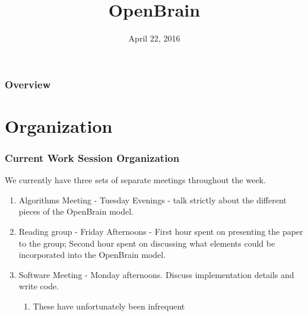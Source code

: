 \documentclass{beamer}
\title[OpenBrain]{OpenBrain}
\date{April 22, 2016} %
\begin{document}
\begin{frame}
\titlepage
\end{frame}

\begin{frame}

\begin{center}
\Huge 
\end{center}

\frametitle{Overview}
\tableofcontents
\end{frame}


\section{Organization} %

    \begin{frame}
        \frametitle{Current Work Session Organization}
        We currently have three sets of separate meetings throughout the week.
        \begin{enumerate}
        \item Algorithms Meeting - Tuesday Evenings - talk strictly about the different pieces of the OpenBrain model.
        \item Reading group - Friday Afternoons - First hour spent on presenting the paper to the group; Second hour spent on discussing what elements could be incorporated into the OpenBrain model.
        \item Software Meeting - Monday afternoons. Discuss implementation details and write code.
        \begin{enumerate}
        \item These have unfortunately been infrequent 
        \end{enumerate}
        \end{enumerate}
       
    \end{frame}
\end{document}
